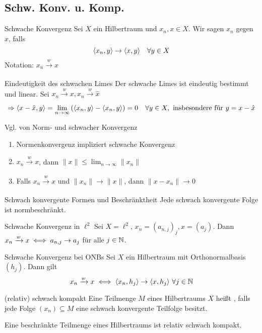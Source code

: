 \subsection*{Schw. Konv. u. Komp.}


\begin{karte}{Schwache Konvergenz}
	Sei $X$ ein Hilbertraum und $x_{n}, x \in X$. Wir sagen $x_{n}$  gegen $x$, falls
		\[ \langle x_{n} , y \rangle \rightarrow \langle x , y \rangle \quad \forall y \in X \]
	Notation: $x_{n} \xrightarrow[]{w} x$	
\end{karte}


\begin{karte}{Eindeutigkeit des schwachen Limes}
	Der schwache Limes ist eindeutig bestimmt und linear. Sei $x_{n} \xrightarrow[]{w} x, x_{n} \xrightarrow[]{w} \hat{x}$
		\[ \Rightarrow \langle x - \hat{x} , y \rangle = \lim_{n \rightarrow \infty} \left( \langle x_{n} , y \rangle - \langle x_{n} , y \rangle \right) = 0 \quad \forall y \in X, \text{ insbesondere für } y = x - \hat{x} \]	
\end{karte}


\begin{karte}{Vgl. von Norm- und schwacher Konvergenz}
	\begin{enumerate}[label=\alph*\upshape)]
		\item Normenkonvergenz impliziert schwache Konvergenz
		\item $x_{n} \xrightarrow[]{w} x$, dann $\| x \| \leq \lim_{n \rightarrow \infty} \| x_{n} \|$
		\item Falls $x_{n} \xrightarrow[]{w} x$ und $\| x_{n} \| \rightarrow \| x \|$, dann $\| x - x_{n} \| \rightarrow 0$
	\end{enumerate}
\end{karte}


\begin{karte}{Schwach konvergente Formen und Beschränktheit}
	Jede schwach konvergente Folge ist normbeschränkt.
\end{karte}

\begin{karte}{Schwache Konvergenz in $\ell^{2}$}
	Sei $X = \ell^{2}$, $x_{n} = (a_{n, j})_{j}, x = (a_{j})$. Dann $x_{n} \xrightarrow[]{w} x \iff a_{n, j} \rightarrow a_{j}$ für alle $j \in \mathbb{N}$.
\end{karte}

\begin{karte}{Schwache Konvergenz bei ONBs}
	Sei $X$ ein Hilbertraum mit Orthonormalbasis $(h_{j})$. Dann gilt
	\[ x_{n} \xrightarrow[]{w} x \iff \langle x_{n} , h_{j} \rangle \rightarrow \langle x , h_{j} \rangle ~ \forall j \in \mathbb{N} \]
\end{karte}

\begin{karte}{(relativ) schwach kompakt}
	Eine Teilmenge $M$ eines Hilbertraums $X$ hei{\ss}t , falls jede Folge $(x_{n}) \subseteq M$ eine schwach konvergente Teilfolge besitzt.

	Eine beschränkte Teilmenge eines Hilbertraums ist relativ schwach kompakt.	
\end{karte}